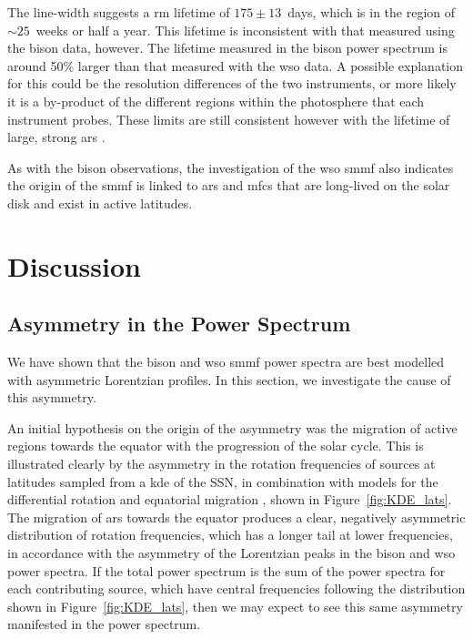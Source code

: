 The line-width suggests a \gls{rm} lifetime of $175 \pm 13$~days, which is in the region of $\sim 25$~weeks or half a year. This lifetime is inconsistent with that measured using the \gls{bison} data, however. The lifetime measured in the \gls{bison} power spectrum is around 50\% larger than that measured with the \gls{wso} data. A possible explanation for this could be the resolution differences of the two instruments, or more likely it is a by-product of the different regions within the photosphere that each instrument probes. These limits are still consistent however with the lifetime of large, strong \glspl{ar} \citep{schrijver_photospheric_1994, van_driel-gesztelyi_evolution_2015}.

As with the \gls{bison} observations, the investigation of the \gls{wso} \gls{smmf} also indicates the origin of the \gls{smmf} is linked to \glspl{ar} and \glspl{mfc} that are long-lived on the solar disk and exist in active latitudes.


\section{Discussion}\label{sec:SMMF_artificial}


\subsection{Asymmetry in the Power Spectrum}
\label{sec:asymmetry}

We have shown that the \gls{bison} and \gls{wso} \gls{smmf} power spectra are best modelled with asymmetric Lorentzian profiles. In this section, we investigate the cause of this asymmetry. 

An initial hypothesis on the origin of the asymmetry was the migration of active regions towards the equator with the progression of the solar cycle. This is illustrated clearly by the asymmetry in the rotation frequencies of sources at latitudes sampled from a \gls{kde} of the SSN, in combination with models for the differential rotation \citep{snodgrass_magnetic_1983} and equatorial migration \citep{li_latitude_2001}, shown in Figure~\ref{fig:KDE_lats}. The migration of \glspl{ar} towards the equator produces a clear, negatively asymmetric distribution of rotation frequencies, which has a longer tail at lower frequencies, in accordance with the asymmetry of the Lorentzian peaks in the \gls{bison} and \gls{wso} power spectra. If the total power spectrum is the sum of the power spectra for each contributing source, which have central frequencies following the distribution shown in Figure~\ref{fig:KDE_lats}, then we may expect to see this same asymmetry manifested in the power spectrum.

